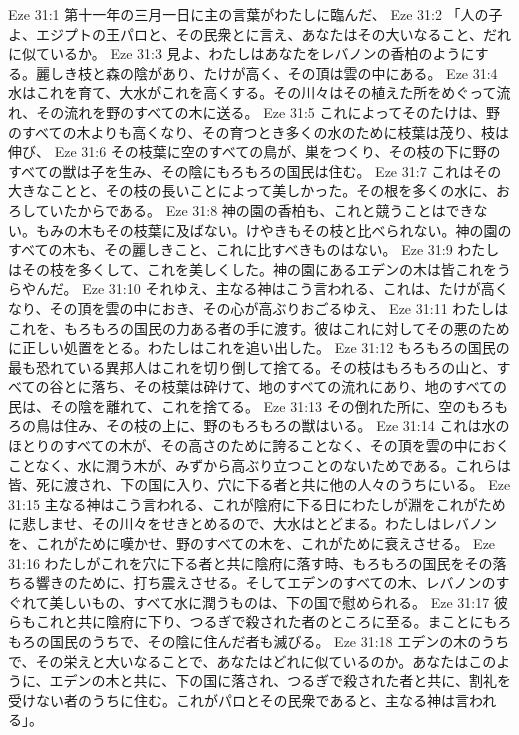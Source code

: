 Eze 31:1  第十一年の三月一日に主の言葉がわたしに臨んだ、
Eze 31:2  「人の子よ、エジプトの王パロと、その民衆とに言え、あなたはその大いなること、だれに似ているか。
Eze 31:3  見よ、わたしはあなたをレバノンの香柏のようにする。麗しき枝と森の陰があり、たけが高く、その頂は雲の中にある。
Eze 31:4  水はこれを育て、大水がこれを高くする。その川々はその植えた所をめぐって流れ、その流れを野のすべての木に送る。
Eze 31:5  これによってそのたけは、野のすべての木よりも高くなり、その育つとき多くの水のために枝葉は茂り、枝は伸び、
Eze 31:6  その枝葉に空のすべての鳥が、巣をつくり、その枝の下に野のすべての獣は子を生み、その陰にもろもろの国民は住む。
Eze 31:7  これはその大きなことと、その枝の長いことによって美しかった。その根を多くの水に、おろしていたからである。
Eze 31:8  神の園の香柏も、これと競うことはできない。もみの木もその枝葉に及ばない。けやきもその枝と比べられない。神の園のすべての木も、その麗しきこと、これに比すべきものはない。
Eze 31:9  わたしはその枝を多くして、これを美しくした。神の園にあるエデンの木は皆これをうらやんだ。
Eze 31:10  それゆえ、主なる神はこう言われる、これは、たけが高くなり、その頂を雲の中におき、その心が高ぶりおごるゆえ、
Eze 31:11  わたしはこれを、もろもろの国民の力ある者の手に渡す。彼はこれに対してその悪のために正しい処置をとる。わたしはこれを追い出した。
Eze 31:12  もろもろの国民の最も恐れている異邦人はこれを切り倒して捨てる。その枝はもろもろの山と、すべての谷とに落ち、その枝葉は砕けて、地のすべての流れにあり、地のすべての民は、その陰を離れて、これを捨てる。
Eze 31:13  その倒れた所に、空のもろもろの鳥は住み、その枝の上に、野のもろもろの獣はいる。
Eze 31:14  これは水のほとりのすべての木が、その高さのために誇ることなく、その頂を雲の中におくことなく、水に潤う木が、みずから高ぶり立つことのないためである。これらは皆、死に渡され、下の国に入り、穴に下る者と共に他の人々のうちにいる。
Eze 31:15  主なる神はこう言われる、これが陰府に下る日にわたしが淵をこれがために悲しませ、その川々をせきとめるので、大水はとどまる。わたしはレバノンを、これがために嘆かせ、野のすべての木を、これがために衰えさせる。
Eze 31:16  わたしがこれを穴に下る者と共に陰府に落す時、もろもろの国民をその落ちる響きのために、打ち震えさせる。そしてエデンのすべての木、レバノンのすぐれて美しいもの、すべて水に潤うものは、下の国で慰められる。
Eze 31:17  彼らもこれと共に陰府に下り、つるぎで殺された者のところに至る。まことにもろもろの国民のうちで、その陰に住んだ者も滅びる。
Eze 31:18  エデンの木のうちで、その栄えと大いなることで、あなたはどれに似ているのか。あなたはこのように、エデンの木と共に、下の国に落され、つるぎで殺された者と共に、割礼を受けない者のうちに住む。これがパロとその民衆であると、主なる神は言われる」。
